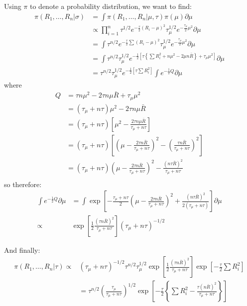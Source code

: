 \documentclass{article}
\begin{document}
Using $\pi$ to denote a probability distribution, we want to find:
\begin{align*}
\pi(R_1, \ldots, R_n| \sigma) &= \int \pi(R_1, \ldots, R_n| \mu, \tau) \pi(\mu) \partial \mu \\
&\propto \prod_{i=1}^n \tau^{1/2} e^{-\frac{\tau}{2} (R_i - \mu)^2} \tau_{\mu}^{1/2} e^{-\frac{\tau_\mu}{2} \mu^2 } \partial \mu \\
&= \int \tau^{n/2} e^{-\frac{\tau}{2} \sum (R_i - \mu)^2} \tau_{\mu}^{1/2} e^{-\frac{\tau_\mu}{2} \mu^2 } \partial \mu \\
&= \int \tau^{n/2} \tau_{\mu}^{1/2} e^{-\frac{1}{2} \left[ \tau \left\{ \sum R_i^2 + n \mu^2 - 2 \mu n \bar{R} \right\} + \tau_\mu \mu^2 \right]} \partial \mu \\
&= \tau^{n/2} \tau_{\mu}^{1/2} e^{-\frac{1}{2} \left[ \tau \sum R_i^2 \right]} \int e^{-\frac{1}{2} Q} \partial \mu 
\end{align*}
where 
\begin{align*}
Q &= \tau n \mu^2 - 2\tau n \mu \bar{R} + \tau_\mu \mu^2 \\
&= (\tau_\mu + n \tau) \mu^2 - 2\tau n \mu \bar{R} \\
&= (\tau_\mu + n \tau) \left[ \mu^2 - \frac{2 \tau n \mu \bar{R}}{ \tau_\mu + n \tau } \right]\\
&= (\tau_\mu + n \tau) \left[ \left( \mu - \frac{2 \tau n \bar{R}}{ \tau_\mu + n \tau } \right)^2 - \left( \frac{ \tau n \bar{R} }{ \tau_\mu + n \tau} \right)^2 \right]\\
&= (\tau_\mu + n \tau) \left( \mu - \frac{2 \tau n \bar{R}}{ \tau_\mu + n \tau } \right)^2 - \frac{(n \tau \bar{R})^2}{ \tau_\mu + n \tau}\\
\end{align*}
so therefore:
\begin{align*}
 \int e^{-\frac{1}{2} Q} \partial \mu &= \int \exp \left[  - \frac{\tau_\mu + n \tau}{2} \left( \mu - \frac{2 \tau n \bar{R}}{ \tau_\mu + n \tau } \right)^2 + \frac{(n \tau \bar{R})^2}{2( \tau_\mu + n \tau)} \right] \partial \mu \\
\propto &  \exp \left[ \frac{1}{2} \frac{ (\tau n \bar{R})^2 }{ \tau_\mu + n \tau } \right] (\tau_\mu + n \tau)^{-1/2}
\end{align*}

And finally:
\begin{align*}
\pi(R_1, \ldots, R_n | \tau) \propto & (\tau_\mu + n \tau)^{-1/2} \tau^{n/2} \tau_\mu^{1/2} \exp \left[ \frac{1}{2} \frac{ (\tau n \bar{R})^2 }{ \tau_\mu + n \tau } \right] \exp \left[ -\frac{\tau}{2} \sum R_i^2 \right] \\
&= \tau^{n/2} \left( \frac{\tau_\mu}{\tau_\mu + n \tau} \right)^{1/2} \exp \left[ -\frac{\tau}{2} \left\{ \sum R_i^2 - \frac{ \tau (n\bar{R})^2 }{ \tau_\mu + n \tau } \right\} \right]
\end{align*}
\end{document}
